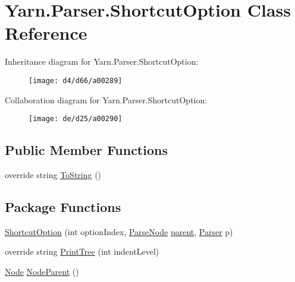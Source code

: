 \hypertarget{a00070}{\section{Yarn.\-Parser.\-Shortcut\-Option Class Reference}
\label{a00070}
}


Inheritance diagram for Yarn.\-Parser.\-Shortcut\-Option\-:
\nopagebreak
\begin{figure}[H]
\begin{center}
\leavevmode
\texttt{[image: d4/d66/a00289]}
\end{center}
\end{figure}


Collaboration diagram for Yarn.\-Parser.\-Shortcut\-Option\-:
\nopagebreak
\begin{figure}[H]
\begin{center}
\leavevmode
\texttt{[image: de/d25/a00290]}
\end{center}
\end{figure}
\subsection*{Public Member Functions}
\begin{DoxyCompactItemize}
\item 
override string \hyperlink{a00063_a18c67cb16090d0889bb9d6c8c6c565f8}{To\-String} ()
\end{DoxyCompactItemize}
\subsection*{Package Functions}
\begin{DoxyCompactItemize}
\item 
\hyperlink{a00070_a2c80b137d65f31b24533987233074605}{Shortcut\-Option} (int option\-Index, \hyperlink{a00063}{Parse\-Node} \hyperlink{a00063_af313a82103fcc2ff5a177dbb06b92f7b}{parent}, \hyperlink{a00064}{Parser} p)
\item 
override string \hyperlink{a00070_a529a2ef1aa6d7226db4ea7f3ea92b8c2}{Print\-Tree} (int indent\-Level)
\item 
\hyperlink{a00054}{Node} \hyperlink{a00063_a580e520a29444fc23ac3660cbe514a09}{Node\-Parent} ()
\end{DoxyCompactItemize}
